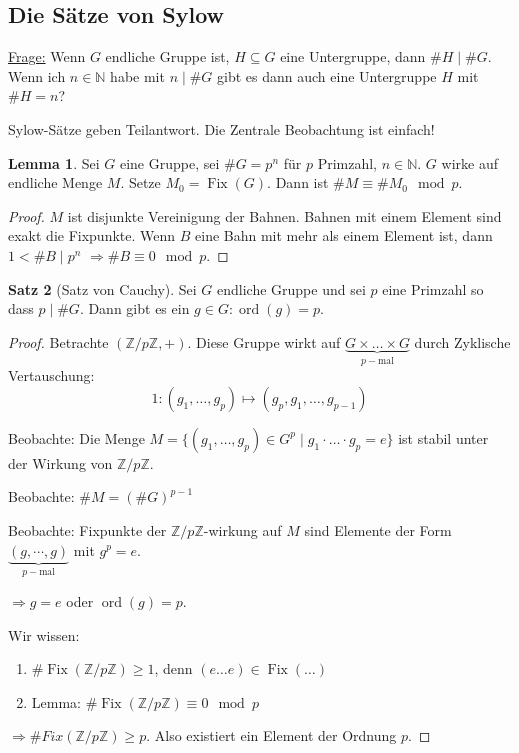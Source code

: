 \documentclass[12pt,parskip=full]{scrartcl}
\newcommand{\setN}{\mathbb{N}}
\newcommand{\setZ}{\mathbb{Z}}
\newcommand{\heading}{\underline}
\theoremstyle{definition}
\newtheorem{theorem}{Satz}[section]
\newtheorem{lemma}[theorem]{Lemma}
\theoremstyle{remark}
\begin{document}
	\subsection{Die Sätze von Sylow}
	
	\heading{Frage:} Wenn $G$ endliche Gruppe ist, $H \subseteq G$ eine Untergruppe, dann $\#H \mid \#G$. Wenn ich $n \in \setN$ habe mit $n \mid \#G$ gibt es dann auch eine Untergruppe $H$ mit $\# H = n$?
	
	Sylow-Sätze geben Teilantwort. Die Zentrale Beobachtung ist einfach!
	
	\begin{lemma}
		\label{lemma:sylowKeyLemma}
		Sei $G$ eine Gruppe, sei $\#G = p^n$ für $p$ Primzahl, $n \in \setN$. $G$ wirke auf endliche Menge $M$. Setze $M_0 = \operatorname{Fix}(G)$. Dann ist $\# M \equiv \# M_0  \mod p$.
	\end{lemma}

	\begin{proof}
		$M$ ist disjunkte Vereinigung der Bahnen. Bahnen mit einem Element sind exakt die Fixpunkte. Wenn $B$ eine Bahn mit mehr als einem Element ist, dann $1 < \#B \mid p^n$ $\Rightarrow \#B \equiv 0 \mod p$.
	\end{proof}

	\begin{theorem}[Satz von Cauchy]
		Sei $G$ endliche Gruppe und sei $p$ eine Primzahl so dass $p \mid \#G$. Dann gibt es ein $g \in G: \operatorname{ord}(g) = p$.
	\end{theorem}

	\begin{proof}
		Betrachte $(\setZ/p\setZ, +)$. Diese Gruppe wirkt auf $\underbrace{G \times \dots \times G}_{p-\text{mal}}$ durch Zyklische Vertauschung:
		\begin{equation*}
			1: (g_1, \dots, g_p) \mapsto (g_p, g_1, \dots, g_{p-1})
		\end{equation*}
		
		Beobachte: Die Menge $M = \{ (g_1, \dots, g_p) \in G^p \mid g_1 \cdot \dots \cdot g_p = e \}$ ist stabil unter der Wirkung von $\setZ/p\setZ$.
		
		Beobachte: $\#M = (\#G)^{p-1}$
		
		Beobachte: Fixpunkte der $\setZ/p\setZ$-wirkung auf $M$ sind Elemente der Form $\underbrace{(g, \cdots , g)}_{p-\text{mal}}$ mit $g^p = e$.
		
		$\Rightarrow g = e$ oder $\operatorname{ord}(g) = p$.
		
		Wir wissen:
		\begin{enumerate}
			\item $\# \operatorname{Fix}(\setZ / p \setZ) \geq 1$, denn $(e \dots e) \in \operatorname{Fix}(\dots)$
			\item Lemma: $\#\operatorname{Fix}(\setZ / p \setZ) \equiv 0 \mod p$
		\end{enumerate}
	
		$\Rightarrow \#Fix(\setZ / p \setZ) \geq p$. Also existiert ein Element der Ordnung $p$.
	\end{proof}
\end{document}
